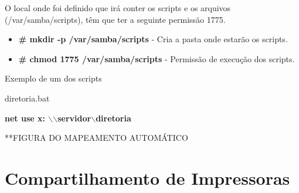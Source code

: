 
O local onde foi definido que irá conter os scripts e os arquivos (/var/samba/scripts), têm que ter a seguinte permissão 1775. 

\begin{itemize}
	\item \textbf{\# mkdir -p /var/samba/scripts} - Cria a pasta onde estarão os scripts.
	\item \textbf{\# chmod 1775 /var/samba/scripts} - Permissão de execução dos scripts.
\end{itemize}

Exemplo de um dos scripts 

diretoria.bat 

\textbf{net use x: $\backslash$$\backslash$servidor$\backslash$diretoria}

**FIGURA DO MAPEAMENTO AUTOMÁTICO 

\section{Compartilhamento de Impressoras}